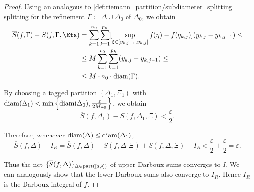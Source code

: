 \begin{proof}
  Using an analogous to \eqref{def:riemann_partition/subdiameter_splitting} splitting for the refinement \( \Gamma \coloneqq \Delta \cup \Delta_0 \) of \( \Delta_0 \), we obtain
  \begin{align*}
    \overline{S}(f, \Gamma) - S(f, \Gamma, \Eta)
    &=
    \sum_{k=1}^{n_0} \sum_{k=1}^{p_k} [ \sup_{\xi \in [y_{k,j-1}, y_{k,j}]} f(\eta) - f(\eta_{k,j}) ] (y_{k,j} - y_{k,j-1})
    \leq \\ &\leq
    M \sum_{k=1}^{n_0} \sum_{k=1}^{p_k} (y_{k,j} - y_{k,j-1})
    \leq \\ &\leq
    M \cdot n_0 \cdot \diam(\Gamma).
  \end{align*}

  By choosing a tagged partition \( (\Delta_1, \Xi_1) \) with \( \operatorname{diam}(\Delta_1) < \min \left\{ \operatorname{diam}(\Delta_0), \frac \varepsilon {2 M n_0} \right\} \), we obtain
  \begin{equation*}
    \overline{S}(f, \Delta_1) - S(f, \Delta_1, \Xi) < \frac \varepsilon 2.
  \end{equation*}

  Therefore, whenever \( \operatorname{diam}(\Delta) \leq \operatorname{diam}(\Delta_1) \),
  \begin{equation*}
    \overline{S}(f, \Delta) - I_R
    =
    \overline{S}(f, \Delta) - S(f, \Delta, \Xi) + S(f, \Delta, \Xi) - I_R
    <
    \frac \varepsilon 2 + \frac \varepsilon 2
    =
    \varepsilon.
  \end{equation*}

  Thus the net \( \{ \overline{S}(f, \Delta) \}_{\Delta \in \operatorname{part}([a, b])} \) of upper Darboux sums converges to \( I \). We can analogously show that the lower Darboux sums also converge to \( I_R \). Hence \( I_R \) is the Darboux integral of \( f \).
\end{proof}

